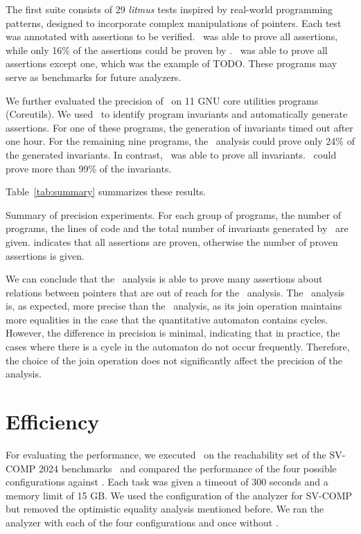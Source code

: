 The first suite consists of 29 \emph{litmus} tests inspired by real-world programming patterns,
designed to incorporate complex manipulations of pointers.
Each test was annotated with assertions to be verified.
\cpou\ was able to prove all assertions,
while only 16\% of the assertions could be proven by \base.
\cpod\ was able to prove all assertions except one, which was the example of TODO.
These programs may serve as benchmarks for future analyzers.

We further evaluated the precision of \cpo\ on 11 GNU core utilities programs (Coreutils).
We used \cpou\ to identify program invariants and automatically generate assertions.
For one of these programs, the generation of invariants timed out after one hour.
For the remaining nine programs, the \base\ analysis could prove only 24\% of the generated invariants.
In contrast, \cpou\ was able to prove all invariants.
\cpod\ could prove more than 99\% of the invariants.

Table~\ref{tab:summary} summarizes these results.

\begin{table}[t]
    \centering
    \caption{Summary of precision experiments. For each group of programs, the number of programs, the lines of code and the total number of invariants generated by \cpou\ are given.
         indicates that all assertions are proven, otherwise the number of proven assertions is given.}
    \label{tab:summary}
    
\end{table}

We can conclude that the \cpo\ analysis is able to prove many assertions about relations between pointers that are out of reach for the \base\ analysis.
The \cpou\ analysis is, as expected, more precise than the \cpod\ analysis, as its join operation maintains more equalities in the case that the quantitative automaton contains cycles.
However, the difference in precision is minimal, indicating that in practice, the cases where there is a cycle in the automaton do not occur frequently.
Therefore, the choice of the join operation does not significantly affect the precision of the analysis.

\section{Efficiency}

For evaluating the performance, we executed \cpo\ on the reachability set
of the SV-COMP 2024 benchmarks~\cite{Beyer24} and compared the performance of the four possible configurations against \base.
Each task was given a timeout of 300 seconds and a memory limit of 15 GB.\@
We used the configuration of the analyzer for SV-COMP but removed the optimistic equality analysis mentioned before.
We ran the analyzer with each of the four configurations and once without \cpo.

